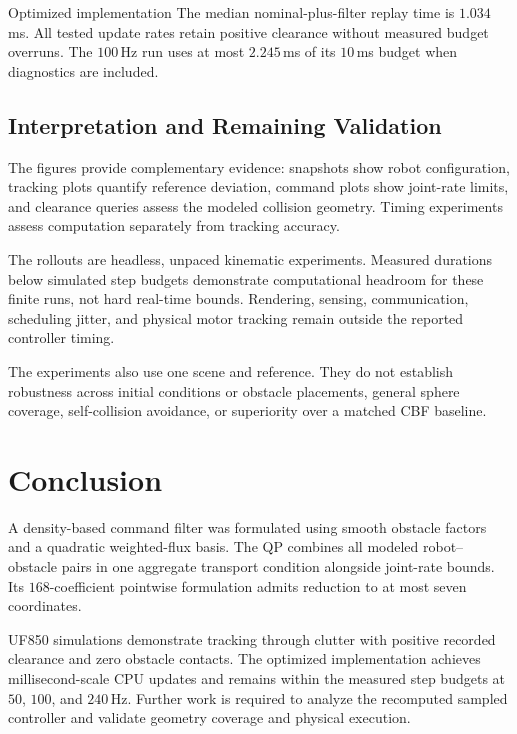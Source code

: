 \documentclass[conference]{IEEEtran}
\begin{document}
\begin{resultbox}{Optimized implementation}
The median nominal-plus-filter replay time is
$1.034$\,ms. All tested update rates retain positive
clearance without measured budget overruns.
The $100$\,Hz run uses at most $2.245$\,ms
of its $10$\,ms budget when diagnostics are included.
\end{resultbox}

\subsection{Interpretation and Remaining Validation}

The figures provide complementary evidence:
snapshots show robot configuration, tracking plots
quantify reference deviation, command plots show
joint-rate limits, and clearance queries assess
the modeled collision geometry.
Timing experiments assess computation separately
from tracking accuracy.

The rollouts are headless, unpaced kinematic
experiments. Measured durations below simulated
step budgets demonstrate computational headroom
for these finite runs, not hard real-time bounds.
Rendering, sensing, communication, scheduling
jitter, and physical motor tracking remain
outside the reported controller timing.

The experiments also use one scene and reference.
They do not establish robustness across initial
conditions or obstacle placements, general
sphere coverage, self-collision avoidance,
or superiority over a matched CBF baseline.


\section{Conclusion}
\label{sec:conclusion}

A density-based command filter was formulated
using smooth obstacle factors and a quadratic
weighted-flux basis.
The QP combines all modeled robot--obstacle pairs
in one aggregate transport condition alongside
joint-rate bounds.
Its $168$-coefficient pointwise formulation
admits reduction to at most seven coordinates.

UF850 simulations demonstrate tracking through
clutter with positive recorded clearance and
zero obstacle contacts.
The optimized implementation achieves
millisecond-scale CPU updates and remains
within the measured step budgets at $50$,
$100$, and $240$\,Hz.
Further work is required to analyze the
recomputed sampled controller and validate
geometry coverage and physical execution.
\end{document}
